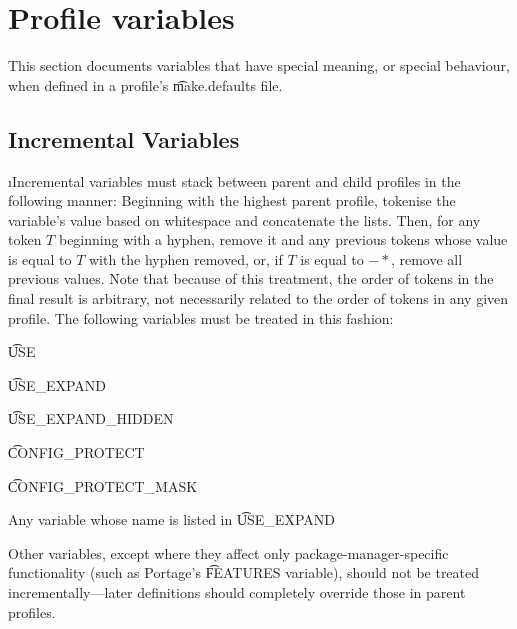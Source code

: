 \section{Profile variables}
\label{profile-variables}

This section documents variables that have special meaning, or special behaviour, when defined in a
profile's \t{make.defaults} file.

\subsection{Incremental Variables}
\i{Incremental} variables must stack between parent and child profiles in the following manner:
Beginning with the highest parent profile, tokenise the variable's value based on whitespace and
concatenate the lists. Then, for any token $T$ beginning with a hyphen, remove it and any previous
tokens whose value is equal to $T$ with the hyphen removed, or, if $T$ is equal to $-*$, remove
all previous values. Note that because of this treatment, the order of tokens in the final result is
arbitrary, not necessarily related to the order of tokens in any given profile. The following
variables must be treated in this fashion:
\begin{bulletlist}
\item \t{USE}
\item \t{USE\_EXPAND}
\item \t{USE\_EXPAND\_HIDDEN}
\item \t{CONFIG\_PROTECT}
\item \t{CONFIG\_PROTECT\_MASK}
\item Any variable whose name is listed in \t{USE\_EXPAND}
\end{bulletlist}

Other variables, except where they affect only package-manager-specific functionality (such as
Portage's \t{FEATURES} variable), should not be treated incrementally---later definitions should
completely override those in parent profiles.

